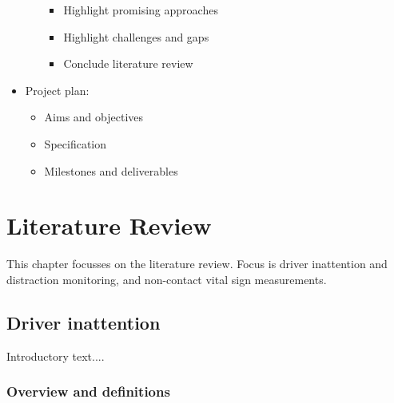 \documentclass[11pt, parskip=half*,twoside=false]{scrbook}
\begin{document}
\begin{itemize}
\begin{itemize}
\begin{itemize}
				\item Highlight promising approaches
				\item Highlight challenges and gaps
				\item Conclude literature review
			\end{itemize}
		\end{itemize} 
	\item Project plan:
	\begin{itemize}
		\item Aims and objectives
		\item Specification
		\item Milestones and deliverables
	\end{itemize}
\end{itemize}


\chapter{Literature Review} \label{ch:litreview}
This chapter focusses on the literature review. Focus is driver inattention and distraction monitoring, and non-contact vital sign measurements. 

\section{Driver inattention} \label{sec:distraction}
Introductory text....

\subsection{Overview and definitions} \label{ssec:overview}
%
\end{document}
